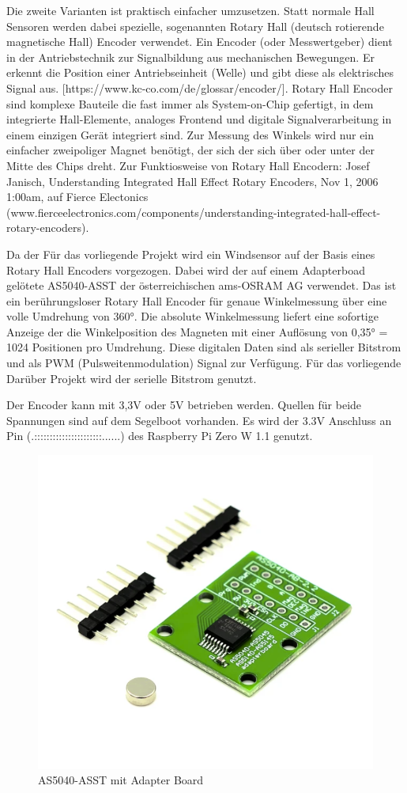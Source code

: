 Die zweite Varianten ist praktisch einfacher umzusetzen. Statt normale Hall Sensoren werden dabei spezielle, sogenannten Rotary Hall (deutsch rotierende magnetische Hall) Encoder verwendet. Ein Encoder (oder Messwertgeber) dient in der Antriebstechnik zur Signalbildung aus mechanischen Bewegungen. Er erkennt die Position einer Antriebseinheit (Welle) und gibt diese als elektrisches Signal aus. [https://www.kc-co.com/de/glossar/encoder/]. Rotary Hall Encoder sind komplexe Bauteile die fast immer als System-on-Chip gefertigt, in dem integrierte Hall-Elemente, analoges Frontend  und digitale Signalverarbeitung in einem einzigen Gerät integriert sind. Zur Messung des Winkels wird nur ein einfacher zweipoliger Magnet benötigt, der sich der sich über oder unter der Mitte des Chips dreht.
Zur Funktiosweise von Rotary Hall Encodern: Josef Janisch, Understanding Integrated Hall Effect Rotary Encoders, Nov 1, 2006 1:00am, auf Fierce Electonics (www.fierceelectronics.com/components/understanding-integrated-hall-effect-rotary-encoders). 

Da der Für das vorliegende Projekt wird ein Windsensor auf der Basis eines Rotary Hall Encoders vorgezogen. Dabei wird der auf einem Adapterboad gelötete AS5040-ASST der österreichischen ams-OSRAM AG verwendet. Das ist ein berührungsloser Rotary Hall Encoder für genaue Winkelmessung über eine volle Umdrehung von 360°.  Die absolute Winkelmessung liefert eine sofortige Anzeige der die Winkelposition des Magneten mit einer Auflösung von 0,35° = 1024 Positionen pro Umdrehung. Diese digitalen Daten sind als serieller Bitstrom und als PWM (Pulsweitenmodulation) Signal zur Verfügung. Für das vorliegende 
Darüber Projekt wird der serielle Bitstrom genutzt. 

Der Encoder kann mit 3,3V oder 5V betrieben werden. Quellen für beide Spannungen sind auf dem Segelboot vorhanden. Es wird der 3.3V Anschluss an Pin (.::::::::::::::::::::::......) des Raspberry Pi Zero W 1.1 genutzt.

\begin{figure}[H]
    \centering
    \includegraphics[width=0.5\linewidth]{assets/as5040image.png}
    \caption{AS5040-ASST mit Adapter Board}
    \label{fig:as5040}
\end{figure}

